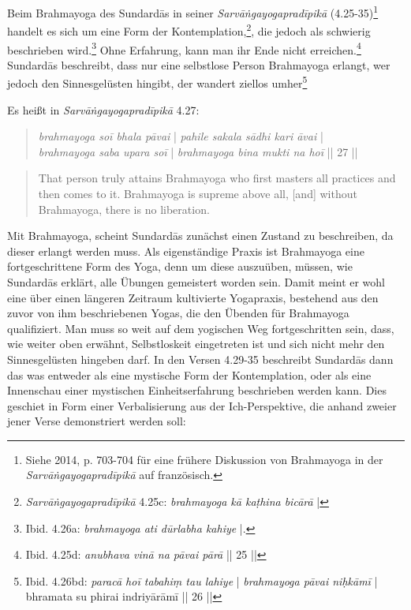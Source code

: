 Beim Brahmayoga des Sundardās in seiner \textit{Sarvāṅgayogapradīpikā} (4.25-35)\footnote{Siehe \citeauthor{burger2014sarvangayogapradipika} 2014, p. 703-704 für eine frühere Diskussion von Brahmayoga in der \textit{Sarvāṅgayogapradīpikā} auf französisch.} handelt es sich um eine Form der Kontemplation,\footnote{\textit{Sarvāṅgayogapradīpikā} 4.25c: \textit{brahmayoga kā kaṭhina bicārā} |}, die jedoch als schwierig beschrieben wird.\footnote{Ibid. 4.26a: \textit{brahmayoga ati dūrlabha kahiye} |.} Ohne Erfahrung, kann man ihr Ende nicht erreichen.\footnote{Ibid. 4.25d: \textit{anubhava vinā na pāvai pārā} || 25 ||} Sundardās beschreibt, dass nur eine selbstlose Person Brahmayoga erlangt, wer jedoch den Sinnesgelüsten hingibt, der wandert ziellos umher\footnote{Ibid. 4.26bd: \textit{paracā hoī tabahiṃ tau lahiye} | \textit{brahmayoga pāvai niḥkāmī} | bhramata su phirai indriyārāmī || 26 ||}

Es heißt in \textit{Sarvāṅgayogapradīpikā} 4.27:
\begin{quote}
\textit{brahmayoga soī bhala pāvai} | \textit{pahile sakala sādhi kari āvai} |\\
\textit{brahmayoga saba upara soī} | \textit{brahmayoga bina mukti na hoī} || 27 ||
\end{quote}
\begin{quote}
That person truly attains Brahmayoga who first masters all practices and then comes to it.  
Brahmayoga is supreme above all, [and] without Brahmayoga, there is no liberation.
\end{quote}

Mit Brahmayoga, scheint Sundardās zunächst einen Zustand zu beschreiben, da dieser erlangt werden muss. Als eigenständige Praxis ist Brahmayoga eine fortgeschrittene Form des Yoga, denn um diese auszuüben, müssen, wie Sundardās erklärt, alle Übungen gemeistert worden sein. Damit meint er wohl eine über einen längeren Zeitraum kultivierte Yogapraxis, bestehend aus den zuvor von ihm beschriebenen Yogas, die den Übenden für Brahmayoga qualifiziert. Man muss so weit auf dem yogischen Weg fortgeschritten sein, dass, wie weiter oben erwähnt, Selbstloskeit eingetreten ist und sich nicht mehr den Sinnesgelüsten hingeben darf. In den Versen 4.29-35 beschreibt Sundardās dann das was entweder als eine mystische Form der Kontemplation, oder als eine Innenschau einer mystischen Einheitserfahrung beschrieben werden kann. Dies geschiet in Form einer Verbalisierung aus der Ich-Perspektive, die anhand zweier jener Verse demonstriert werden soll: 

